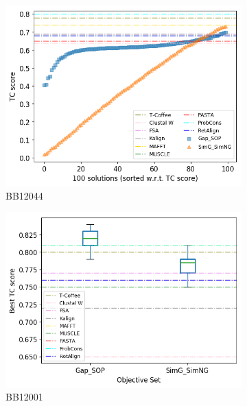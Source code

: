 \begin{figure}[!htbp]
\begin{adjustwidth}{-1cm}{-1cm}
\begin{subfigure}{0.22\textwidth}
			\includegraphics[width=\columnwidth]{Figure/summary/precomputedInit/Balibase/BB12044_tc_density_single_run_2}
			\caption{BB12044}
		\end{subfigure}
		\begin{subfigure}{0.22\textwidth}
			\includegraphics[width=\columnwidth]{Figure/summary/precomputedInit/Balibase/BB12001_objset_tc_rank_2}
			\caption{BB12001}
		\end{subfigure}	
		\begin{subfigure}{0.22\textwidth}

\end{subfigure}
\end{adjustwidth}
\end{figure}
